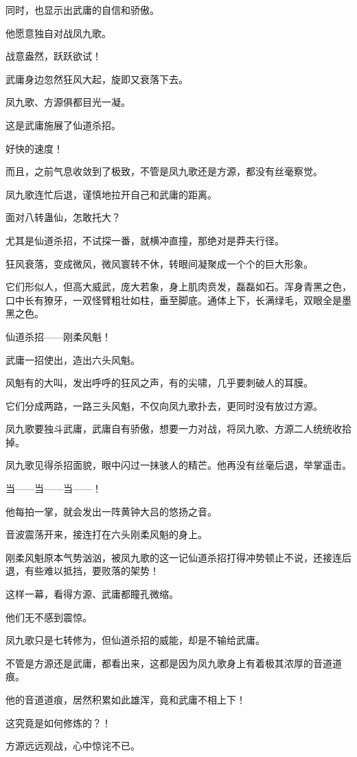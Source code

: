 \begin{this_body}
同时，也显示出武庸的自信和骄傲。

他愿意独自对战凤九歌。

战意盎然，跃跃欲试！

武庸身边忽然狂风大起，旋即又衰落下去。

凤九歌、方源俱都目光一凝。

这是武庸施展了仙道杀招。

好快的速度！

而且，之前气息收敛到了极致，不管是凤九歌还是方源，都没有丝毫察觉。

凤九歌连忙后退，谨慎地拉开自己和武庸的距离。

面对八转蛊仙，怎敢托大？

尤其是仙道杀招，不试探一番，就横冲直撞，那绝对是莽夫行径。

狂风衰落，变成微风，微风寰转不休，转眼间凝聚成一个个的巨大形象。

它们形似人，但高大威武，庞大若象，身上肌肉贲发，磊磊如石。浑身青黑之色，口中长有獠牙，一双怪臂粗壮如柱，垂至脚底。通体上下，长满绿毛，双眼全是墨黑之色。

仙道杀招——刚柔风魁！

武庸一招使出，造出六头风魁。

风魁有的大叫，发出呼呼的狂风之声，有的尖啸，几乎要刺破人的耳膜。

它们分成两路，一路三头风魁，不仅向凤九歌扑去，更同时没有放过方源。

凤九歌要独斗武庸，武庸自有骄傲，想要一力对战，将凤九歌、方源二人统统收拾掉。

凤九歌见得杀招面貌，眼中闪过一抹骇人的精芒。他再没有丝毫后退，举掌遥击。

当——当——当——！

他每拍一掌，就会发出一阵黄钟大吕的悠扬之音。

音波震荡开来，接连打在六头刚柔风魁的身上。

刚柔风魁原本气势汹汹，被凤九歌的这一记仙道杀招打得冲势顿止不说，还接连后退，有些难以抵挡，要败落的架势！

这样一幕，看得方源、武庸都瞳孔微缩。

他们无不感到震惊。

凤九歌只是七转修为，但仙道杀招的威能，却是不输给武庸。

不管是方源还是武庸，都看出来，这都是因为凤九歌身上有着极其浓厚的音道道痕。

他的音道道痕，居然积累如此雄浑，竟和武庸不相上下！

这究竟是如何修炼的？！

方源远远观战，心中惊诧不已。


\end{this_body}
